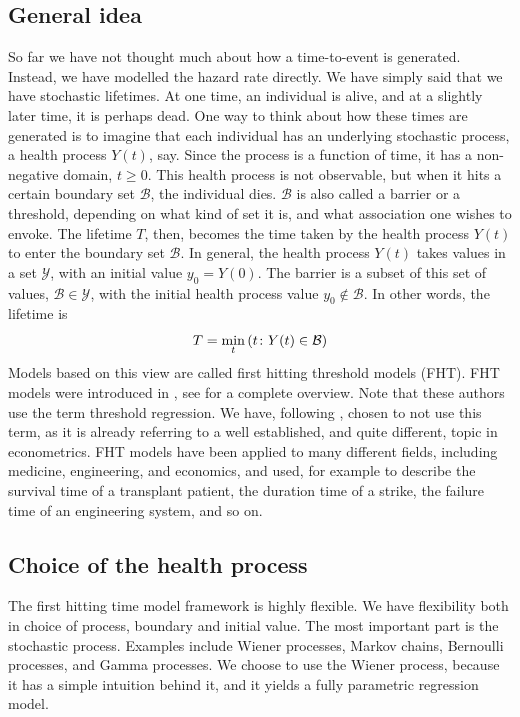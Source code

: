 \subsection{General idea}
So far we have not thought much about how a time-to-event is generated. Instead, we have modelled the hazard rate directly. We have simply said that we have stochastic lifetimes. At one time, an individual is alive, and at a slightly later time, it is perhaps dead. One way to think about how these times are generated is to imagine that each individual has an underlying stochastic process, a health process $Y(t)$, say. Since the process is a function of time, it has a non-negative domain, $t\geq0$. This health process is not observable, but when it hits a certain boundary set $\mathcal{B}$, the individual dies. $\mathcal{B}$ is also called a barrier or a threshold, depending on what kind of set it is, and what association one wishes to envoke. The lifetime $T$, then, becomes the time taken by the health process $Y(t)$ to enter the boundary set $\mathcal{B}$. In general, the health process $Y(t)$ takes values in a set $\mathcal{Y}$, with an initial value $y_0=Y(0)$. The barrier is a subset of this set of values, $\mathcal{B}\in\mathcal{Y}$, with the initial health process value $y_0\notin\mathcal{B}$. In other words, the lifetime is
\begin{equation}\label{eq:fht-t}
    T=\min_t\left(t\colon Y(t)\in\mathcal{B}\right)
\end{equation}
Models based on this view are called first hitting threshold models (FHT). FHT models were introduced in \citet{whitmore1986}, see \citet{leewhitmore2006} for a complete overview. Note that these authors use the term threshold regression. We have, following \citet{caroni2017}, chosen to not use this term, as it is already referring to a well established, and quite different, topic in econometrics. FHT models have been applied to many different fields, including medicine, engineering, and economics, and used, for example to describe the survival time of a transplant patient, the duration time of a strike, the failure time of an engineering system, and so on.

\subsection{Choice of the health process}
The first hitting time model framework is highly flexible. We have flexibility both in choice of process, boundary and initial value. The most important part is the stochastic process. Examples include Wiener processes, Markov chains, Bernoulli processes, and Gamma processes. We choose to use the Wiener process, because it has a simple intuition behind it, and it yields a fully parametric regression model.

